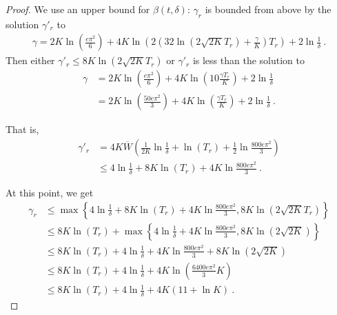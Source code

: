 \begin{proof}
We use an upper bound for $\beta(t, \delta)$: $\gamma_r$ is bounded from above by the solution $\gamma'_r$ to
\begin{align*}
\gamma = 2 K\ln \left(\frac{e\pi^2}{6}\right) + 4 K \ln \left(2(32 \ln (2\sqrt{2K} T_r) + \frac{\gamma}{K}) T_r\right) + 2\ln \frac{1}{\delta}
\: .
\end{align*}
Then either $\gamma'_r \le 8 K \ln (2\sqrt{2K} T_r)$ or $\gamma'_r$ is less than the solution to
\begin{align*}
\gamma
&= 2 K\ln \left(\frac{e\pi^2}{6}\right) + 4 K \ln \left(10\frac{\gamma T_r}{K}\right) + 2\ln \frac{1}{\delta}
\\
&= 2 K\ln \left(\frac{50 e\pi^2}{3}\right) + 4 K \ln \left(\frac{\gamma T_r}{K}\right) + 2\ln \frac{1}{\delta} 
\: .
\end{align*}


That is,
\begin{align*}
\gamma'_r
&= 4K \overline{W}\left( \frac{1}{2K} \ln \frac{1}{\delta} + \ln(T_r) + \frac{1}{2}\ln\frac{800 e \pi^2}{3} \right)
\\
&\le 4 \ln \frac{1}{\delta} + 8K \ln(T_r) + 4K \ln\frac{800 e \pi^2}{3}
\: .
\end{align*}

At this point, we get
\begin{align*}
\gamma_r
&\le \max\left\{ 4 \ln \frac{1}{\delta} + 8K \ln(T_r) + 4K \ln\frac{800 e \pi^2}{3},  8 K \ln (2\sqrt{2K} T_r)\right\}
\\
&\le 8K \ln(T_r) + \max\left\{ 4 \ln \frac{1}{\delta} + 4K \ln\frac{800 e \pi^2}{3}, 8 K \ln (2\sqrt{2K})\right\}
\\
&\le 8K \ln(T_r) + 4 \ln \frac{1}{\delta} + 4K \ln\frac{800 e \pi^2}{3} + 8 K \ln (2\sqrt{2K})
\\
&\le 8K \ln(T_r) + 4 \ln \frac{1}{\delta} + 4K \ln\left(\frac{6400 e \pi^2}{3}K\right)
\\
&\le 8K \ln(T_r) + 4 \ln \frac{1}{\delta} + 4K (11 + \ln K)
\: .
\end{align*}


\end{proof}